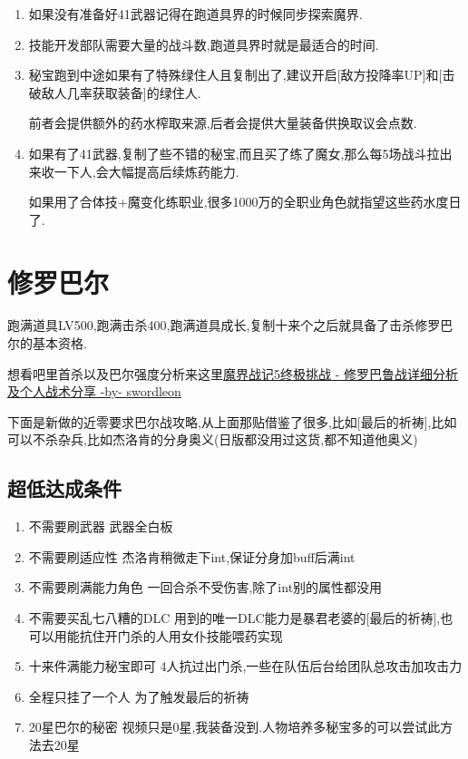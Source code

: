 	\begin{enumerate}
		\item
		如果没有准备好41武器记得在跑道具界的时候同步探索魔界.

		\item
		技能开发部队需要大量的战斗数,跑道具界时就是最适合的时间.


		\item
		秘宝跑到中途如果有了特殊绿住人且复制出了,建议开启[敌方投降率UP]和[击破敌人几率获取装备]的绿住人.

		前者会提供额外的药水榨取来源,后者会提供大量装备供换取议会点数.

		\item
		如果有了41武器,复制了些不错的秘宝,而且买了练了魔女,那么每5场战斗拉出来收一下人,会大幅提高后续炼药能力.

		如果用了合体技+魔变化练职业,很多1000万的全职业角色就指望这些药水度日了.

	\end{enumerate}


	\newpage

	\section{修罗巴尔}

	跑满道具LV500,跑满击杀400,跑满道具成长,复制十来个之后就具备了击杀修罗巴尔的基本资格.

	想看吧里首杀以及巴尔强度分析来这里\href{http://tieba.baidu.com/p/3949061316}{魔界战记5终极挑战 - 修罗巴鲁战详细分析及个人战术分享 -by- swordleon }

	下面是新做的近零要求巴尔战攻略,从上面那贴借鉴了很多,比如[最后的祈祷],比如可以不杀杂兵,比如杰洛肯的分身奥义(日版都没用过这货,都不知道他奥义)

	\subsection{超低达成条件}
	\begin{enumerate}
		\item{不需要刷武器}
		武器全白板

		\item{不需要刷适应性}
		杰洛肯稍微走下int,保证分身加buff后满int

		\item{不需要刷满能力角色}
		一回合杀不受伤害,除了int别的属性都没用

		\item{不需要买乱七八糟的DLC}
		用到的唯一DLC能力是暴君老婆的[最后的祈祷],也可以用能抗住开门杀的人用女仆技能喂药实现

		\item{十来件满能力秘宝即可}
		4人抗过出门杀,一些在队伍后台给团队总攻击加攻击力

		\item{全程只挂了一个人}
		为了触发最后的祈祷

		\item{20星巴尔的秘密}
		视频只是0星,我装备没到.人物培养多秘宝多的可以尝试此方法去20星
	\end{enumerate}

